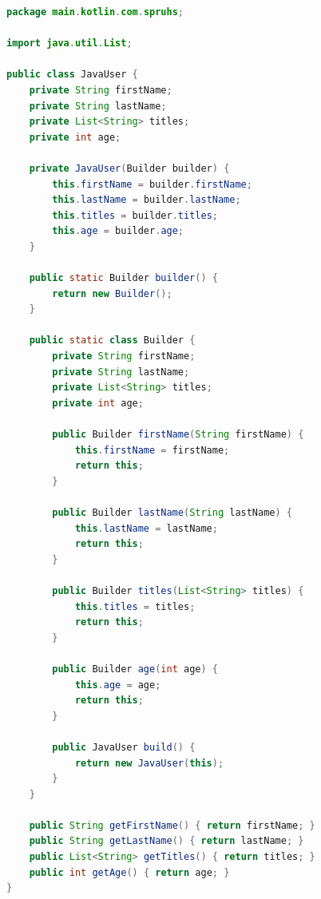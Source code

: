 \documentclass[11pt]{article}
\begin{document}
    \begin{lstlisting}[language=Java, caption={JavaUser.kt}, label={lst:java-builder-pattern}]
        package main.kotlin.com.spruhs;

import java.util.List;

public class JavaUser {
    private String firstName;
    private String lastName;
    private List<String> titles;
    private int age;

    private JavaUser(Builder builder) {
        this.firstName = builder.firstName;
        this.lastName = builder.lastName;
        this.titles = builder.titles;
        this.age = builder.age;
    }

    public static Builder builder() {
        return new Builder();
    }

    public static class Builder {
        private String firstName;
        private String lastName;
        private List<String> titles;
        private int age;

        public Builder firstName(String firstName) {
            this.firstName = firstName;
            return this;
        }

        public Builder lastName(String lastName) {
            this.lastName = lastName;
            return this;
        }

        public Builder titles(List<String> titles) {
            this.titles = titles;
            return this;
        }

        public Builder age(int age) {
            this.age = age;
            return this;
        }

        public JavaUser build() {
            return new JavaUser(this);
        }
    }

    public String getFirstName() { return firstName; }
    public String getLastName() { return lastName; }
    public List<String> getTitles() { return titles; }
    public int getAge() { return age; }
}
    \end{lstlisting}
\end{document}
